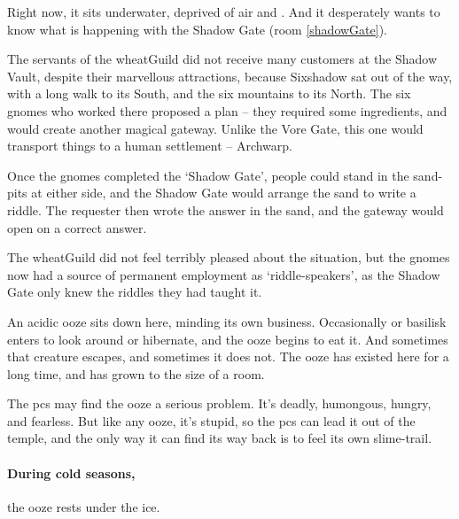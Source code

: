 \begin{multicols}{2}
Right now, it sits underwater, deprived of air and .
And it desperately wants to know what is happening with the Shadow Gate (room \vref{shadowGate}).



\begin{exampletext}
  The servants of the \gls{wheatGuild} did not receive many customers at the Shadow Vault, despite their marvellous attractions, because Sixshadow sat out of the way, with a long walk to its South, and the six mountains to its North.
  The six gnomes who worked there proposed a plan -- they required some \glspl{ingredient}, and would create another magical gateway.
  Unlike the Vore Gate, this one would transport things to a human settlement -- Archwarp.

  Once the gnomes completed the `Shadow Gate', people could stand in the sand-pits at either side, and the Shadow Gate would arrange the sand to write a riddle.
  The requester then wrote the answer in the sand, and the gateway would open on a correct answer.

  The \gls{wheatGuild} did not feel terribly pleased about the situation, but the gnomes now had a source of permanent employment as `riddle-speakers', as the Shadow Gate only knew the riddles they had taught it.
\end{exampletext}

An acidic ooze sits down here, minding its own business.
Occasionally  or \gls{basilisk} enters to look around or hibernate, and the ooze begins to eat it.
And sometimes that creature escapes, and sometimes it does not.
The ooze has existed here for a long time, and has grown to the size of a room.

\uncommonlyLargeJelly

The \glspl{pc} may find the ooze a serious problem.
It's deadly, humongous, hungry, and fearless.
But like any ooze, it's stupid, so the \glspl{pc} can lead it out of the temple, and the only way it can find its way back is to feel its own slime-trail.

\paragraph{During cold seasons,}
the ooze rests under the ice.


\end{multicols}
